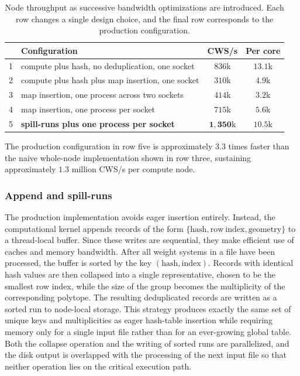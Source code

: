 \documentclass[appliedmath,article,submit,moreauthors]{Definitions/mdpi}
\begin{document}
\begin{table}[H]
\caption{Node throughput as successive bandwidth optimizations are introduced.
Each row changes a single design choice, and the final row corresponds to the
production configuration.\label{tab:node-ladder}}
\begin{threeparttable}
\begin{tabularx}{\textwidth}{clCC}
\toprule
 & \textbf{Configuration} & \textbf{CWS/s} & \textbf{Per core} \\
 & compute plus hash, no deduplication, one socket & \(836\)k & \(13.1\)k \\
2 & compute plus hash plus map insertion, one socket & \(310\)k & \(4.9\)k \\
3 & map insertion, one process across two sockets & \(414\)k & \(3.2\)k \\
4 & map insertion, one process per socket & \(715\)k & \(5.6\)k \\
5 & \textbf{spill-runs plus one process per socket} & \(\mathbf{1{,}350}\)k &
  \(\mathbf{10.5}\)k \\
\bottomrule
\end{tabularx}
\begin{tablenotes}[flushleft]\footnotesize
\item The production configuration in row five is approximately \(3.3\) times
faster than the naive whole-node implementation shown in row three, sustaining
approximately \(1.3\) million CWS/s per compute node.
\end{tablenotes}
\end{threeparttable}
\end{table}

\subsubsection{Append and spill-runs}

The production implementation avoids eager insertion entirely. Instead, the
computational kernel appends records of the form
\(\{\mathrm{hash},\mathrm{row\ index},\mathrm{geometry}\}\) to a thread-local
buffer. Since these writes are sequential, they make efficient use of caches and
memory bandwidth. After all weight systems in a file have been processed, the
buffer is sorted by the key \((\mathrm{hash},\mathrm{index})\). Records with
identical hash values are then collapsed into a single representative, chosen to
be the smallest row index, while the size of the group becomes the multiplicity
of the corresponding polytope. The resulting deduplicated records are written as
a sorted run to node-local storage.
This strategy produces exactly the same set of unique keys and multiplicities as
eager hash-table insertion while requiring memory only for a single input file
rather than for an ever-growing global table. Both the collapse operation and
the writing of sorted runs are parallelized, and the disk output is overlapped
with the processing of the next input file so that neither operation lies on the
critical execution path.
\end{document}
